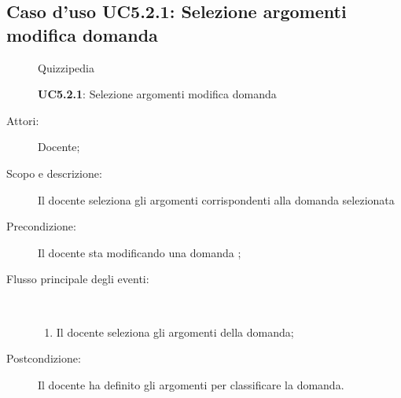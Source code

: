 \subsection{Caso d'uso UC5.2.1: Selezione argomenti modifica domanda}
	\begin{figure}[H]
		\centering
		\begin{resizedtikzpicture}{\textwidth}
		\begin{umlsystem}[x=0, fill=lightgray!20]{Quizzipedia}
		\end{umlsystem}
		\end{resizedtikzpicture}
		\caption{\textbf{UC5.2.1}: Selezione argomenti modifica domanda}
		\label{UC5.2.1}
	\end{figure}
\begin{description}
\item[Attori:] Docente;
\item[Scopo e descrizione:] Il docente seleziona gli argomenti corrispondenti alla domanda selezionata
      \item[Precondizione:] Il docente sta modificando una domanda
;

        \item[Flusso principale degli eventi:] \ 
 \begin{enumerate}
          \item Il docente seleziona gli argomenti della domanda;

      \end{enumerate}
    \item[Postcondizione:] Il docente ha definito gli argomenti per classificare la domanda.
  \end{description}
\hypertarget{UC5.2.2}{}
